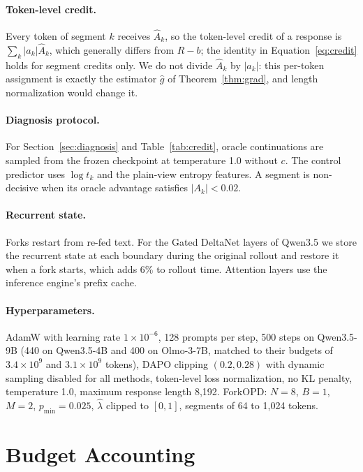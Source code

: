 \documentclass[11pt]{article}
\newcommand{\method}{ForkOPD}
\newcommand{\Ah}{\hat A}
\theoremstyle{remark}
\begin{document}
\paragraph{Token-level credit.}
Every token of segment $k$ receives $\Ah_k$, so the token-level credit of a response is $\sum_k|a_k|\Ah_k$, which generally differs from $R-b$; the identity in Equation~\eqref{eq:credit} holds for segment credits only. We do not divide $\Ah_k$ by $|a_k|$: this per-token assignment is exactly the estimator $\hat g$ of Theorem~\ref{thm:grad}, and length normalization would change it.

\paragraph{Diagnosis protocol.}
For Section~\ref{sec:diagnosis} and Table~\ref{tab:credit}, oracle continuations are sampled from the frozen checkpoint at temperature 1.0 without $c$. The control predictor uses $\log t_k$ and the plain-view entropy features. A segment is non-decisive when its oracle advantage satisfies $|A_k|<0.02$.

\paragraph{Recurrent state.}
Forks restart from re-fed text. For the Gated DeltaNet layers of Qwen3.5 we store the recurrent state at each boundary during the original rollout and restore it when a fork starts, which adds 6\% to rollout time. Attention layers use the inference engine's prefix cache.

\paragraph{Hyperparameters.}
AdamW with learning rate $1\times10^{-6}$, 128 prompts per step, 500 steps on Qwen3.5-9B (440 on Qwen3.5-4B and 400 on Olmo-3-7B, matched to their budgets of $3.4\times10^9$ and $3.1\times10^9$ tokens), DAPO clipping $(0.2,0.28)$ with dynamic sampling disabled for all methods, token-level loss normalization, no KL penalty, temperature 1.0, maximum response length 8{,}192. \method{}: $N=8$, $B=1$, $M=2$, $p_{\min}=0.025$, $\hat\lambda$ clipped to $[0,1]$, segments of 64 to 1{,}024 tokens.

\section{Budget Accounting}
\label{app:budget}
\end{document}
